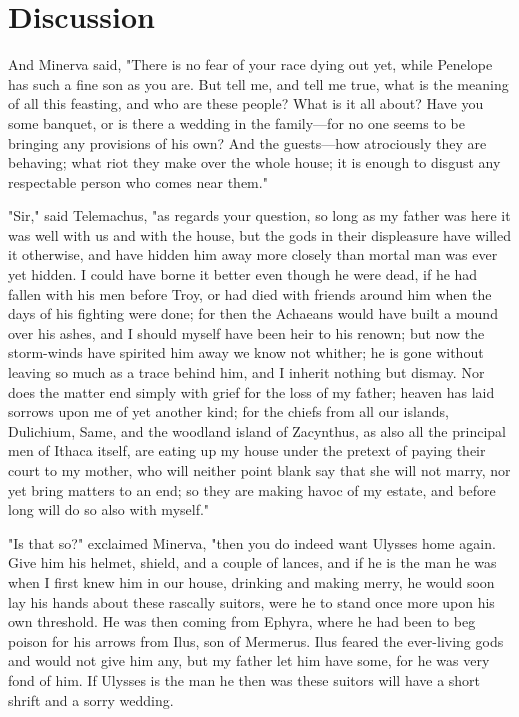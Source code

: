 \section{Discussion}

And Minerva said, "There is no fear of your race dying out yet, while Penelope
has such a fine son as you are. But tell me, and tell me true, what is the
meaning of all this feasting, and who are these people? What is it all about?
Have you some banquet, or is there a wedding in the family—for no one seems to
be bringing any provisions of his own? And the guests—how atrociously they are
behaving; what riot they make over the whole house; it is enough to disgust
any respectable person who comes near them."

"Sir," said Telemachus, "as regards your question, so long as my father was
here it was well with us and with the house, but the gods in their displeasure
have willed it otherwise, and have hidden him away more closely than mortal
man was ever yet hidden. I could have borne it better even though he were dead,
if he had fallen with his men before Troy, or had died with friends around him
when the days of his fighting were done; for then the Achaeans would have
built a mound over his ashes, and I should myself have been heir to his renown;
but now the storm-winds have spirited him away we know not whither; he is gone
without leaving so much as a trace behind him, and I inherit nothing but
dismay. Nor does the matter end simply with grief for the loss of my father;
heaven has laid sorrows upon me of yet another kind; for the chiefs from all
our islands, Dulichium, Same, and the woodland island of Zacynthus, as also
all the principal men of Ithaca itself, are eating up my house under the
pretext of paying their court to my mother, who will neither point blank say
that she will not marry, nor yet bring matters to an end; so they are making
havoc of my estate, and before long will do so also with myself."

"Is that so?" exclaimed Minerva, "then you do indeed want Ulysses home again.
Give him his helmet, shield, and a couple of lances, and if he is the man he
 was when I first knew him in our house, drinking and making merry, he would
 soon lay his hands about these rascally suitors, were he to stand once more
 upon his own threshold. He was then coming from Ephyra, where he had been to
 beg poison for his arrows from Ilus, son of Mermerus. Ilus feared the
 ever-living gods and would not give him any, but my father let him have some,
 for he was very fond of him. If Ulysses is the man he then was these suitors
 will have a short shrift and a sorry wedding.
